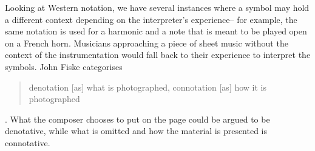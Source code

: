 Looking at Western notation, we have several instances where a symbol may hold a different context depending on the interpreter's experience-- 
for example, the same notation is used for a harmonic and a note that is meant to be played open on a French horn.\autocite[]{schuilingNotationCulturesEthnomusicology2019}
Musicians approaching a piece of sheet music without the context of the instrumentation would fall back to their experience to interpret the symbols.
John Fiske categorises \begin{quotation}
    denotation [as] what is photographed, connotation [as] how it is photographed
\end{quotation}.\autocite[91]{fiskeIntroductionCommunicationStudies2011}
What the composer chooses to put on the page could be argued to be denotative, while what is omitted and how the material is presented is connotative.

